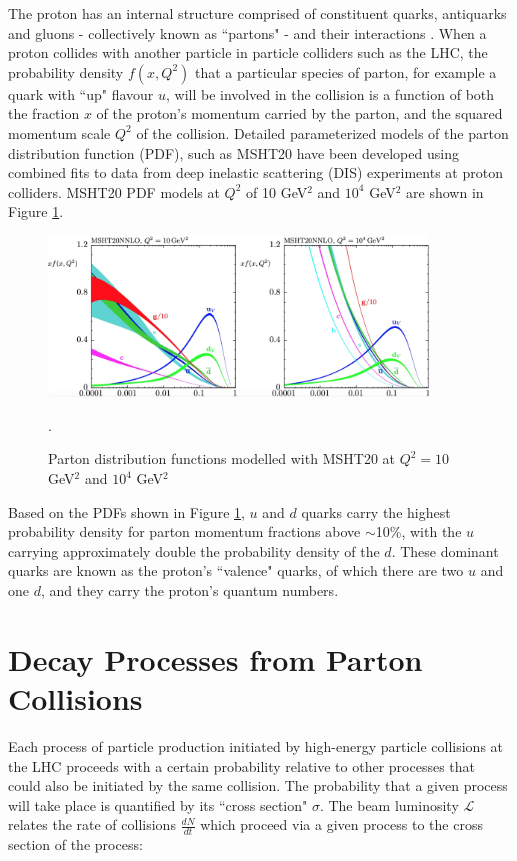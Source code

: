 The proton has an internal structure comprised of constituent quarks, antiquarks and gluons - collectively known as ``partons" - and their interactions \cite{parton_model}. When a proton collides with another particle in particle colliders such as the LHC, the probability density $f(x, Q^2)$ that a particular species of parton, for example a quark with ``up" flavour $u$, will be involved in the collision is a function of both the fraction $x$ of the proton's momentum carried by the parton, and the squared momentum scale $Q^2$ of the collision. Detailed parameterized models of the parton distribution function (PDF), such as MSHT20 \cite{MSHT20} have been developed using combined fits to data from deep inelastic scattering (DIS) experiments at proton colliders. MSHT20 PDF models at $Q^2$ of 10 GeV$^2$ and $10^4$ GeV$^2$ are shown in Figure \ref{fig:msht20_pdfs}.

\begin{figure}[H]
	\centering
	\includegraphics[width=0.9\textwidth]{Figures/3/MSHT20_PDFs.png}
	\caption[]{Parton distribution functions modelled with MSHT20 at $Q^2=10$ GeV$^2$ and $10^4$ GeV$^2$}.
	\label{fig:msht20_pdfs}
\end{figure}

Based on the PDFs shown in Figure \ref{fig:msht20_pdfs}, $u$ and $d$ quarks carry the highest probability density for parton momentum fractions above $\sim$10\%, with the $u$ carrying approximately double the probability density of the $d$. These dominant quarks are known as the proton's ``valence" quarks, of which there are two $u$ and one $d$, and they carry the proton's quantum numbers.

\section{Decay Processes from Parton Collisions}

Each process of particle production initiated by high-energy particle collisions at the LHC proceeds with a certain probability relative to other processes that could also be initiated by the same collision. The probability that a given process will take place is quantified by its ``cross section" $\sigma$. The beam luminosity $\mathcal{L}$ relates the rate of collisions $\frac{dN}{dt}$ which proceed via a given process to the cross section of the process:

